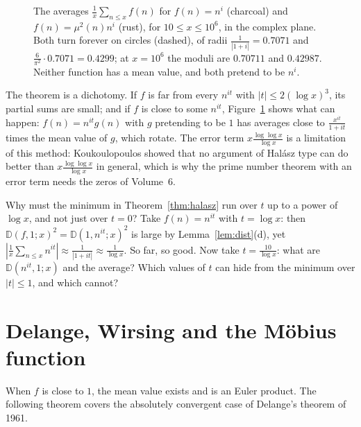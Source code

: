 \begin{figure}[ht]
\centering
{}
\caption{The averages $\frac1x\sum_{n\le x}f(n)$ for $f(n)=n^{i}$ (charcoal) and $f(n)=\mu^2(n)n^{i}$ (rust), for $10\le x\le10^6$, in the complex plane. Both turn forever on circles (dashed), of radii $\frac1{|1+i|}=0.7071$ and $\frac6{\pi^2}\cdot0.7071=0.4299$; at $x=10^6$ the moduli are $0.70711$ and $0.42987$. Neither function has a mean value, and both pretend to be $n^{i}$.}
\label{fig:spiral}
\end{figure}

The theorem is a dichotomy. If $f$ is far from every $n^{it}$ with $|t|\le2(\log x)^3$, its partial sums are small; and if $f$ is close to some $n^{it}$, Figure~\ref{fig:spiral} shows what can happen: $f(n)=n^{it}g(n)$ with $g$ pretending to be $1$ has averages close to $\frac{x^{it}}{1+it}$ times the mean value of $g$, which rotate. The error term $x\frac{\log\log x}{\log x}$ is a limitation of this method: Koukoulopoulos showed that no argument of Halász type can do better than $x\frac{\log\log x}{\log x}$ in general, which is why the prime number theorem with an error term needs the zeros of Volume~6.

\begin{think}
Why must the minimum in Theorem~\ref{thm:halasz} run over $t$ up to a power of $\log x$, and not just over $t=0$? Take $f(n)=n^{it}$ with $t=\log x$: then $\mathbb D(f,1;x)^2=\mathbb D(1,n^{it};x)^2$ is large by Lemma~\ref{lem:dist}(d), yet $|\frac1x\sum_{n\le x}n^{it}|\approx\frac1{|1+it|}\approx\frac1{\log x}$. So far, so good. Now take $t=\frac{10}{\log x}$: what are $\mathbb D(n^{it},1;x)$ and the average? Which values of $t$ can hide from the minimum over $|t|\le1$, and which cannot?
\end{think}

\section{Delange, Wirsing and the Möbius function}

When $f$ is close to $1$, the mean value exists and is an Euler product. The following theorem covers the absolutely convergent case of Delange's theorem of 1961.

